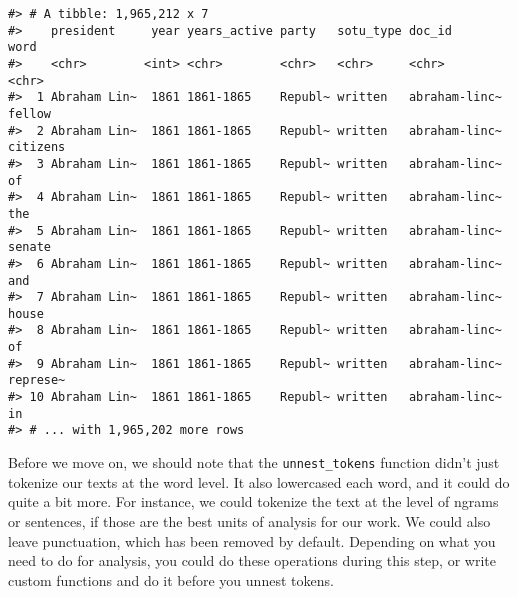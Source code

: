 \documentclass[]{book}
\newenvironment{Shaded}{\begin{snugshade}}{\end{snugshade}}
\newcommand{\CommentTok}[1]{\textcolor[rgb]{0.56,0.35,0.01}{\textit{#1}}}
\newcommand{\DataTypeTok}[1]{\textcolor[rgb]{0.13,0.29,0.53}{#1}}
\newcommand{\KeywordTok}[1]{\textcolor[rgb]{0.13,0.29,0.53}{\textbf{#1}}}
\newcommand{\NormalTok}[1]{#1}
\newcommand{\OperatorTok}[1]{\textcolor[rgb]{0.81,0.36,0.00}{\textbf{#1}}}
\newcommand{\OtherTok}[1]{\textcolor[rgb]{0.56,0.35,0.01}{#1}}
\newcommand{\StringTok}[1]{\textcolor[rgb]{0.31,0.60,0.02}{#1}}
\begin{document}
\begin{verbatim}
#> # A tibble: 1,965,212 x 7
#>    president     year years_active party   sotu_type doc_id        word    
#>    <chr>        <int> <chr>        <chr>   <chr>     <chr>         <chr>   
#>  1 Abraham Lin~  1861 1861-1865    Republ~ written   abraham-linc~ fellow  
#>  2 Abraham Lin~  1861 1861-1865    Republ~ written   abraham-linc~ citizens
#>  3 Abraham Lin~  1861 1861-1865    Republ~ written   abraham-linc~ of      
#>  4 Abraham Lin~  1861 1861-1865    Republ~ written   abraham-linc~ the     
#>  5 Abraham Lin~  1861 1861-1865    Republ~ written   abraham-linc~ senate  
#>  6 Abraham Lin~  1861 1861-1865    Republ~ written   abraham-linc~ and     
#>  7 Abraham Lin~  1861 1861-1865    Republ~ written   abraham-linc~ house   
#>  8 Abraham Lin~  1861 1861-1865    Republ~ written   abraham-linc~ of      
#>  9 Abraham Lin~  1861 1861-1865    Republ~ written   abraham-linc~ represe~
#> 10 Abraham Lin~  1861 1861-1865    Republ~ written   abraham-linc~ in      
#> # ... with 1,965,202 more rows
\end{verbatim}

Before we move on, we should note that the \texttt{unnest\_tokens} function didn't just tokenize our texts at the word level. It also lowercased each word, and it could do quite a bit more. For instance, we could tokenize the text at the level of ngrams or sentences, if those are the best units of analysis for our work. We could also leave punctuation, which has been removed by default. Depending on what you need to do for analysis, you could do these operations during this step, or write custom functions and do it before you unnest tokens.

\begin{Shaded}
\end{Shaded}
\end{document}
